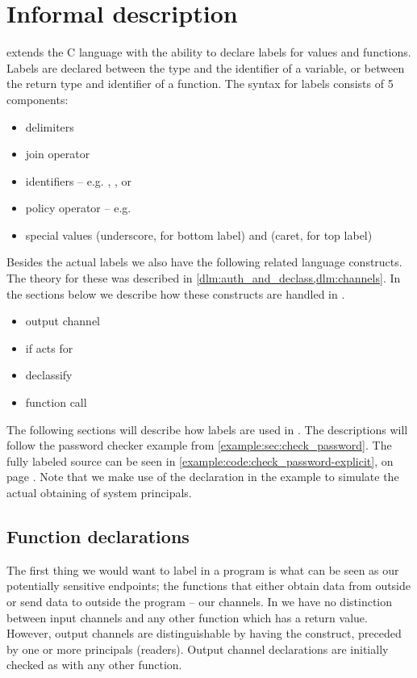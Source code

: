 \section{Informal description}\label{ctif:informal}
\thelang{} extends the C language with the ability to declare labels for values and functions.
Labels are declared between the type and the identifier of a variable, or between the return type and identifier of a function.
The syntax for labels consists of 5 components:
\begin{itemize}
  \item delimiters \dlmc{\{\{ \}\}}
  \item join operator \dlmc{;}
  \item identifiers -- e.g. , , or 
  \item policy operator \dlmc{->} -- e.g. 
  \item special values \dlmc{_} (underscore, for bottom label) and \dlmc{^} (caret, for top label)
\end{itemize}

Besides the actual labels we also have the following related language constructs.
The theory for these was described in \cref{dlm:auth_and_declass,dlm:channels}.
In the sections below we describe how these constructs are handled in \thelang.

\begin{itemize}
  \item output channel 
  \item if acts for 
  \item declassify 
  \item function call 
\end{itemize}

The following sections will describe how labels are used in \thelang.
The descriptions will follow the password checker example from \cref{example:sec:check_password}.
The fully labeled source can be seen in \cref{example:code:check_password-explicit}, on page \pageref{example:code:check_password-explicit}.
Note that we make use of the  declaration in the example to simulate the actual obtaining of system principals.

\subsection{Function declarations}
The first thing we would want to label in a program is what can be seen as our potentially sensitive endpoints; the functions that either obtain data from outside or send data to outside the program -- our channels.
In \thelang{} we have no distinction between input channels and any other function which has a return value.
However, output channels are distinguishable by having the \dlmc{<-} construct, preceded by one or more principals (readers).
Output channel declarations are initially checked as with any other function.

